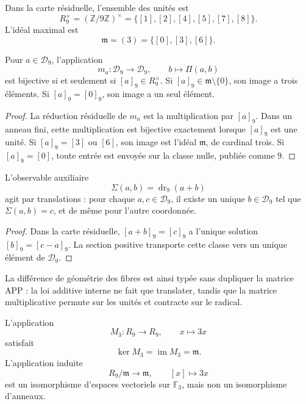 Dans la carte résiduelle, l’ensemble des unités est
\[
 R_9^\times=(\mathbb Z/9\mathbb Z)^\times
   =\{[1],[2],[4],[5],[7],[8]\}.
\]
L’idéal maximal est
\[
 \mathfrak m=(3)=\{[0],[3],[6]\}.
\]

\begin{theorem}
\label{p12-83-c1-s1:thm:app-clasificacion-filas-producto}
Pour \(a\in\mathcal D_9\), l'application
\[
 m_a:\mathcal D_9\longrightarrow\mathcal D_9,
 \qquad b\longmapsto\Pi(a,b)
\]
est bijective si et seulement si \([a]_9\in R_9^\times\). Si
\([a]_9\in\mathfrak m\setminus\{0\}\), son image a trois éléments. Si
\([a]_9=[0]_9\), son image a un seul élément.
\end{theorem}

\begin{proof}
La réduction résiduelle de \(m_a\) est la multiplication par \([a]_9\). Dans un
anneau fini, cette multiplication est bijective exactement lorsque \([a]_9\)
est une unité. Si \([a]_9=[3]\) ou \([6]\), son image est l’idéal
\(\mathfrak m\), de cardinal trois. Si \([a]_9=[0]\), toute entrée est envoyée
sur la classe nulle, publiée comme \(9\).
\end{proof}

\begin{proposition}
\label{p12-83-c1-s1:prop:app-latinidad-aditiva}
L’observable auxiliaire
\[
 \Sigma(a,b)=\operatorname{dr}_9(a+b)
\]
agit par translations : pour chaque \(a,c\in\mathcal D_9\), il existe un unique
\(b\in\mathcal D_9\) tel que \(\Sigma(a,b)=c\), et de même pour l’autre
coordonnée.
\end{proposition}

\begin{proof}
Dans la carte résiduelle, \([a+b]_9=[c]_9\) a l’unique solution
\([b]_9=[c-a]_9\). La section positive transporte cette classe vers un unique
élément de \(\mathcal D_9\).
\end{proof}

La différence de géométrie des fibres est ainsi typée sans dupliquer la matrice
APP : la loi additive interne ne fait que translater, tandis que la matrice multiplicative
permute sur les unités et contracte sur le radical.

\begin{proposition}
\label{p12-83-c1-s1:prop:app-radical-lineal}
L'application
\[
 M_3:R_9\longrightarrow R_9,
 \qquad x\longmapsto3x
\]
satisfait
\[
 \ker M_3=\operatorname{im}M_3=\mathfrak m.
\]
L’application induite
\[
 R_9/\mathfrak m\longrightarrow\mathfrak m,
 \qquad [x]\longmapsto3x
\]
est un isomorphisme d’espaces vectoriels sur \(\mathbb F_3\), mais non un
isomorphisme d’anneaux.
\end{proposition}

